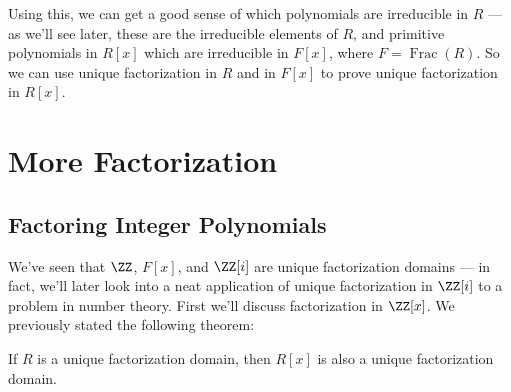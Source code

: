 Using this, we can get a good sense of which polynomials are irreducible in $R$ --- as we'll see later, these are the irreducible elements of $R$, and primitive polynomials in $R[x]$ which are irreducible in $F[x]$, where $F = \operatorname{Frac}(R)$. So we can use unique factorization in $R$ and in $F[x]$ to prove unique factorization in $R[x]$. 

 
 




\section{More Factorization}

\subsection{Factoring Integer Polynomials}

We've seen that $\ZZ$, $F[x]$, and $\ZZ[i]$ are unique factorization domains --- in fact, we'll later look into a neat application of unique factorization in $\ZZ[i]$ to a problem in number theory. First we'll discuss factorization in $\ZZ[x]$. We previously stated the following theorem:

\begin{theorem}\label{ufd polynomial}
If $R$ is a unique factorization domain, then $R[x]$ is also a unique factorization domain. 
\end{theorem}

